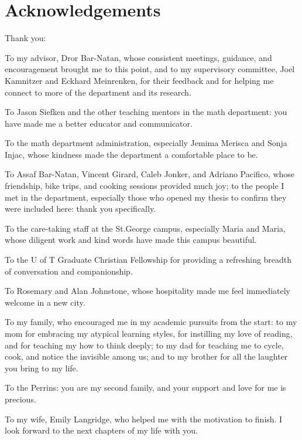 
\begingroup
\let\clearpage\relax
\let\cleardoublepage\relax

\chapter*{Acknowledgements}

Thank you:

To my advisor, Dror Bar-Natan, whose consistent meetings, guidance, and
encouragement brought me to this point, and to my supervisory committee, Joel
Kamnitzer and Eckhard Meinrenken, for their feedback and for helping me connect
to more of the department and its research.

To Jason Siefken and the other teaching mentors in the math department: you have
made me a better educator and communicator.

To the math department administration, especially Jemima Merisca and Sonja
Injac, whose kindness made the department a comfortable place to be.

To Assaf Bar-Natan, Vincent Girard, Caleb Jonker, and Adriano Pacifico, whose
friendship, bike trips, and cooking sessions provided much joy; to the people I
met in the department, especially those who opened my thesis to confirm they
were included here: thank you specifically.

To the care-taking staff at the St.\@ George campus, especially Maria and Maria,
whose diligent work and kind words have made this campus beautiful.

To the U of T Graduate Christian Fellowship for providing a refreshing breadth
of conversation and companionship.

To Rosemary and Alan Johnstone, whose hospitality made me feel immediately
welcome in a new city.

To my family, who encouraged me in my academic pursuits from the start: to my
mom for embracing my atypical learning styles, for instilling my love of
reading, and for teaching my how to think deeply; to my dad for teaching me to
cycle, cook, and notice the invisible among us; and to my brother for all the
laughter you bring to my life.

To the Perrins: you are my second family, and your support and love for me is
precious.

To my wife, Emily Langridge, who helped me with the motivation to finish. I look
forward to the next chapters of my life with you.

\endgroup

